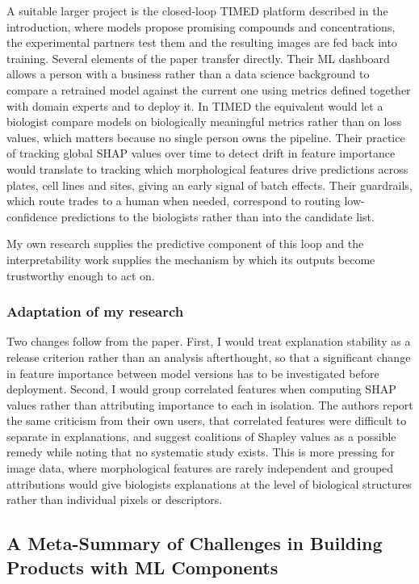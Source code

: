\documentclass{article}
\begin{document}
A suitable larger project is the closed-loop TIMED platform described in the introduction, where models propose promising compounds and concentrations, the experimental partners test them and the resulting images are fed back into training. Several elements of the paper transfer directly. Their ML dashboard allows a person with a business rather than a data science background to compare a retrained model against the current one using metrics defined together with domain experts and to deploy it. In TIMED the equivalent would let a biologist compare models on biologically meaningful metrics rather than on loss values, which matters because no single person owns the pipeline. Their practice of tracking global SHAP values over time to detect drift in feature importance would translate to tracking which morphological features drive predictions across plates, cell lines and sites, giving an early signal of batch effects. Their guardrails, which route trades to a human when needed, correspond to routing low-confidence predictions to the biologists rather than into the candidate list.

My own research supplies the predictive component of this loop and the interpretability work supplies the mechanism by which its outputs become trustworthy enough to act on.

\subsubsection*{Adaptation of my research}

Two changes follow from the paper. First, I would treat explanation stability as a release criterion rather than an analysis afterthought, so that a significant change in feature importance between model versions has to be investigated before deployment. Second, I would group correlated features when computing SHAP values rather than attributing importance to each in isolation. The authors report the same criticism from their own users, that correlated features were difficult to separate in explanations, and suggest coalitions of Shapley values as a possible remedy while noting that no systematic study exists. This is more pressing for image data, where morphological features are rarely independent and grouped attributions would give biologists explanations at the level of biological structures rather than individual pixels or descriptors.

\subsection{A Meta-Summary of Challenges in Building Products with ML Components}
\end{document}
